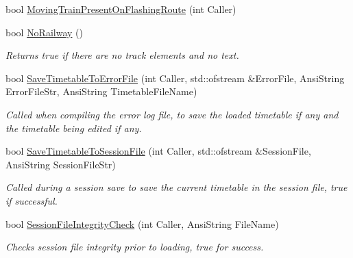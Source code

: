 \begin{DoxyCompactItemize}
bool \mbox{\hyperlink{class_t_interface_a1cd9f01bcbcc37fb31712b7007d04dac}{Moving\+Train\+Present\+On\+Flashing\+Route}} (int Caller)
\item 
\mbox{\label{class_t_interface_a488e772a2e2a52820fdbe1d1695e0118}} 
bool \mbox{\hyperlink{class_t_interface_a488e772a2e2a52820fdbe1d1695e0118}{No\+Railway}} ()
\begin{DoxyCompactList}\small\item\em Returns true if there are no track elements and no text. \end{DoxyCompactList}\item 
\mbox{\label{class_t_interface_af2ff1eef8152e33d0025ec7cd250fc08}} 
bool \mbox{\hyperlink{class_t_interface_af2ff1eef8152e33d0025ec7cd250fc08}{Save\+Timetable\+To\+Error\+File}} (int Caller, std\+::ofstream \&Error\+File, Ansi\+String Error\+File\+Str, Ansi\+String Timetable\+File\+Name)
\begin{DoxyCompactList}\small\item\em Called when compiling the error log file, to save the loaded timetable if any and the timetable being edited if any. \end{DoxyCompactList}\item 
\mbox{\label{class_t_interface_af6cda9d0f26c60eb3810c2523b830c25}} 
bool \mbox{\hyperlink{class_t_interface_af6cda9d0f26c60eb3810c2523b830c25}{Save\+Timetable\+To\+Session\+File}} (int Caller, std\+::ofstream \&Session\+File, Ansi\+String Session\+File\+Str)
\begin{DoxyCompactList}\small\item\em Called during a session save to save the current timetable in the session file, true if successful. \end{DoxyCompactList}\item 
\mbox{\label{class_t_interface_a3904f26b67b9512507960187b37b6f7b}} 
bool \mbox{\hyperlink{class_t_interface_a3904f26b67b9512507960187b37b6f7b}{Session\+File\+Integrity\+Check}} (int Caller, Ansi\+String File\+Name)
\begin{DoxyCompactList}\small\item\em Checks session file integrity prior to loading, true for success. \end{DoxyCompactList}\item 

\end{DoxyCompactItemize}
